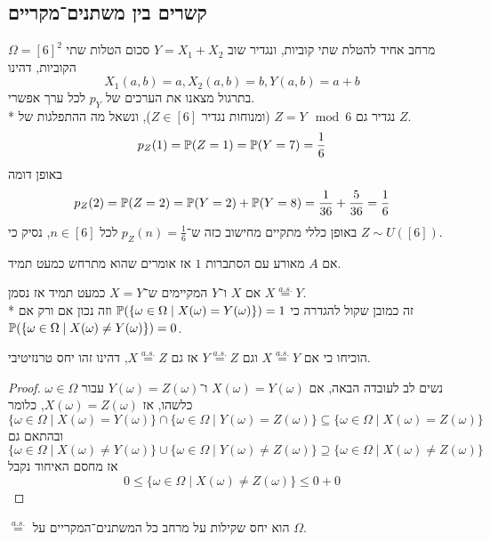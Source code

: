 \subsection{קשרים בין משתנים־מקריים}
\begin{example}
	$\Omega = {[6]}^2$ מרחב אחיד להטלת שתי קוביות, ונגדיר שוב $Y = X_1 + X_2$ סכום הטלות שתי הקוביות, דהינו
	\[
		X_1(a, b) = a,
		X_2(a, b) = b,
		Y(a, b) = a + b
	\]
	בתרגול מצאנו את הערכים של $p_Y$ לכל ערך אפשרי. \\*
	נגדיר גם $Z = Y \mod 6$ (ומנוחות נגדיר $Z \in [6]$), ונשאל מה ההתפלגות של $Z$.
	\[
		p_Z(1) = \mathbb{P}(Z = 1) = \mathbb{P}(Y = 7) = \frac{1}{6}
	\]
	באופן דומה
	\[
		p_Z(2) = \mathbb{P}(Z = 2) = \mathbb{P}(Y = 2) + \mathbb{P}(Y = 8) = \frac{1}{36} + \frac{5}{36} = \frac{1}{6}
	\]
	באופן כללי מתקיים מחישוב כזה ש־$p_Z(n) = \frac{1}{6}$ לכל $n \in [6]$, נסיק כי $Z \sim U([6])$.
\end{example}
\begin{definition}
	אם $A$ מאורע עם הסתברות $1$ אז אומרים שהוא מתרחש כמעט תמיד.
\end{definition}
\begin{definition}
	אם $X$ ו־$Y$ המקיימים ש־$X = Y$ כמעט תמיד אז נסמן $X \overset{a.s.}{=} Y$. \\*
	זה כמובן שקול להגדרה כי $\mathbb{P}(\{ \omega \in \Omega \mid X(\omega) = Y(\omega) \}) = 1$ וזה נכון אם ורק אם $\mathbb{P}(\{\omega \in \Omega \mid X(\omega) \ne Y(\omega) \}) = 0$.
\end{definition}
\begin{exercise}
	הוכיחו כי אם $X \overset{a.s.}{=} Y$ וגם $Y \overset{a.s.}{=} Z$ אז גם $X \overset{a.s.}{=} Z$, דהינו זהו יחס טרנזיטיבי.
\end{exercise}
\begin{proof}
	נשים לב לעובדה הבאה, אם $X(\omega) = Y(\omega)$ ו־$Y(\omega) = Z(\omega)$ עבור $\omega \in \Omega$ כלשהו, אז $X(\omega) = Z(\omega)$,
	כלומר
	\[
		\{ \omega \in \Omega \mid X(\omega) = Y(\omega) \} \cap \{ \omega \in \Omega \mid Y(\omega) = Z(\omega) \} \subseteq \{ \omega \in \Omega \mid X(\omega) = Z(\omega) \}
	\]
	ובהתאם גם
	\[
		\{ \omega \in \Omega \mid X(\omega) \ne Y(\omega) \} \cup \{ \omega \in \Omega \mid Y(\omega) \ne Z(\omega) \} \supseteq \{ \omega \in \Omega \mid X(\omega) \ne Z(\omega) \}
	\]
	אז מחסם האיחוד נקבל
	\[
		0 \le \{ \omega \in \Omega \mid X(\omega) \ne Z(\omega) \} \le 0 + 0
	\]
\end{proof}
\begin{proposition}
	$\overset{a.s.}{=}$ הוא יחס שקילות על מרחב כל המשתנים־המקריים על $\Omega$.
\end{proposition}
